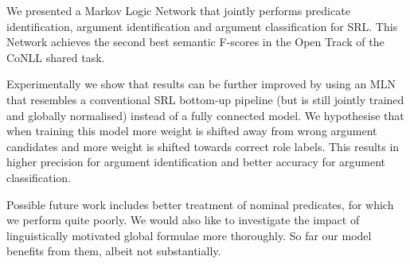 

We presented a Markov Logic Network that jointly performs predicate identification, argument identification and argument classification for SRL. This Network achieves the second best semantic F-scores in the Open Track of the CoNLL shared task. 

Experimentally we show that results can be further improved by using an MLN that resembles a conventional SRL bottom-up pipeline (but is still jointly trained and globally normalised) instead of a fully connected model. We hypothesise that when training this model more weight is shifted away from wrong argument candidates and more weight is shifted towards correct role labels. This results in higher precision for argument identification and better accuracy for argument classification. 

Possible future work includes better treatment of nominal predicates, for which we perform quite poorly. We would also like to investigate the impact of linguistically motivated global formulae more thoroughly. So far our model benefits from them, albeit not substantially. 

